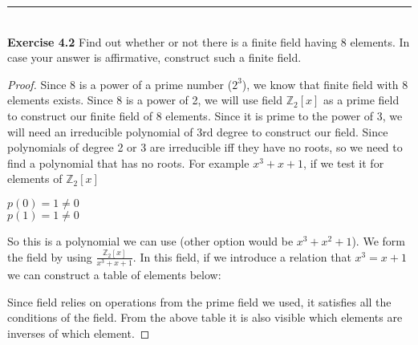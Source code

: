 \documentclass{article}
\begin{document}
\noindent\rule{12cm}{0.4pt}\\
\noindent \textbf{Exercise 4.2} Find out whether or not there is a finite field having 8 elements. In case your answer is affirmative, construct such a finite field.
\begin{proof}
Since 8 is a power of a prime number ($2^3$), we know that finite field with 8 elements exists. Since 8 is a power of 2, we will use field $\mathbb{Z}_{2}[x]$ as a prime field to construct our finite field of 8 elements. Since it is prime to the power of 3, we will need an irreducible polynomial of 3rd degree to construct our field. Since polynomials of degree 2 or 3 are irreducible iff they have no roots, so we need to find a polynomial that has no roots. For example $x^3 + x + 1$, if we test it for elements of $\mathbb{Z}_{2}[x]$
\begin{center}
$p(0) = 1 \neq 0$\\
$p(1) = 1 \neq 0$	
\end{center}
So this is a polynomial we can use (other option would be $x^3 + x^2 + 1$). We form the field by using $\frac{\mathbb{Z}_{2}[x]}{x^3 + x + 1}$. In this field, if we introduce a relation that $x^3 = x + 1$ we can construct a table of elements below:
\begin{center}
\centering
{}
\end{center}
Since field relies on operations from the prime field we used, it satisfies all the conditions of the field. From the above table it is also visible which elements are inverses of which element.
\end{proof}
\end{document}
